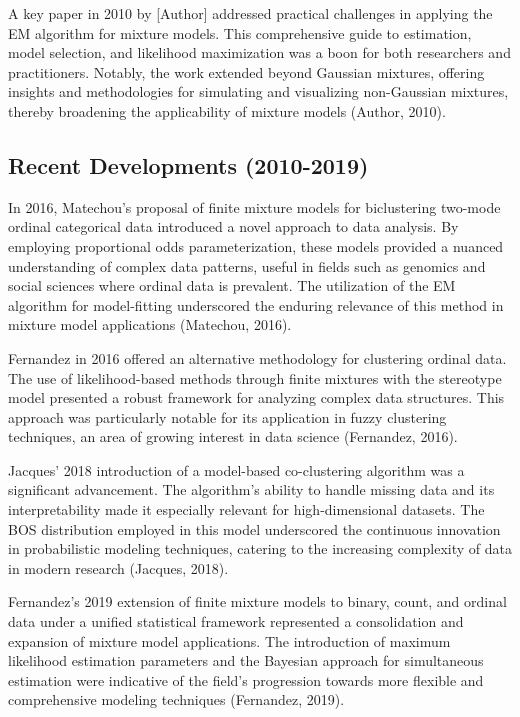 \documentclass{article}
\begin{document}
A key paper in 2010 by [Author] addressed practical challenges in applying the EM algorithm for mixture models. This comprehensive guide to estimation, model selection, and likelihood maximization was a boon for both researchers and practitioners. Notably, the work extended beyond Gaussian mixtures, offering insights and methodologies for simulating and visualizing non-Gaussian mixtures, thereby broadening the applicability of mixture models (Author, 2010).

\subsection*{Recent Developments (2010-2019)}

In 2016, Matechou's proposal of finite mixture models for biclustering two-mode ordinal categorical data introduced a novel approach to data analysis. By employing proportional odds parameterization, these models provided a nuanced understanding of complex data patterns, useful in fields such as genomics and social sciences where ordinal data is prevalent. The utilization of the EM algorithm for model-fitting underscored the enduring relevance of this method in mixture model applications (Matechou, 2016).

Fernandez in 2016 offered an alternative methodology for clustering ordinal data. The use of likelihood-based methods through finite mixtures with the stereotype model presented a robust framework for analyzing complex data structures. This approach was particularly notable for its application in fuzzy clustering techniques, an area of growing interest in data science (Fernandez, 2016).

Jacques' 2018 introduction of a model-based co-clustering algorithm was a significant advancement. The algorithm's ability to handle missing data and its interpretability made it especially relevant for high-dimensional datasets. The BOS distribution employed in this model underscored the continuous innovation in probabilistic modeling techniques, catering to the increasing complexity of data in modern research (Jacques, 2018).

Fernandez's 2019 extension of finite mixture models to binary, count, and ordinal data under a unified statistical framework represented a consolidation and expansion of mixture model applications. The introduction of maximum likelihood estimation parameters and the Bayesian approach for simultaneous estimation were indicative of the field's progression towards more flexible and comprehensive modeling techniques (Fernandez, 2019).
\end{document}
